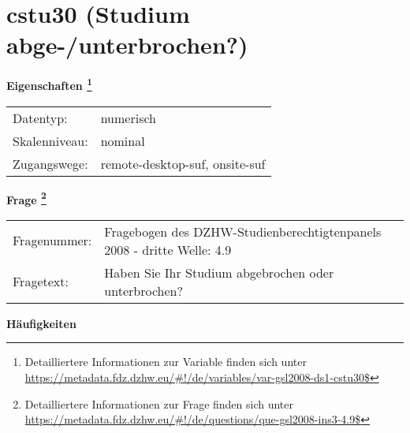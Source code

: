 
    \setcounter{footnote}{0}

    \vspace*{-1.8cm}
	\section{cstu30 (Studium abge-/unterbrochen?)}
	\label{section:cstu30}



    \vspace*{0.5cm}
    \noindent\textbf{Eigenschaften
	\footnote{Detailliertere Informationen zur Variable finden sich unter
		\url{https://metadata.fdz.dzhw.eu/\#!/de/variables/var-gsl2008-ds1-cstu30$}}}\\
	\begin{tabularx}{\hsize}{@{}lX}
	Datentyp: & numerisch \\
	Skalenniveau: & nominal \\
	Zugangswege: &
	  remote-desktop-suf, 
	  onsite-suf
 \\
    \end{tabularx}



				\vspace*{0.5cm}
                \noindent\textbf{Frage
	                \footnote{Detailliertere Informationen zur Frage finden sich unter
		              \url{https://metadata.fdz.dzhw.eu/\#!/de/questions/que-gsl2008-ins3-4.9$}}}\\
				\begin{tabularx}{\hsize}{@{}lX}
					Fragenummer: &
					  Fragebogen des DZHW-Studienberechtigtenpanels 2008 - dritte Welle:
					  4.9
 \\
					Fragetext: & Haben Sie Ihr Studium abgebrochen oder unterbrochen? \\
				\end{tabularx}





        		\vspace*{0.5cm}
                \noindent\textbf{Häufigkeiten}

